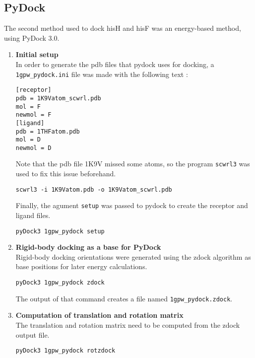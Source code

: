 \documentclass[11pt]{article}
\begin{document}
\subsection{PyDock}\label{pydock}

The second method used to dock hisH and hisF was an energy-based method,
using PyDock 3.0.

\begin{enumerate}
\def\labelenumi{\arabic{enumi}.}
\item
  \textbf{Initial setup}\\
  In order to generate the pdb files that pydock uses for docking, a
  \texttt{1gpw\_pydock.ini} file was made with the following text :

\begin{verbatim}
[receptor]  
pdb = 1K9Vatom_scwrl.pdb  
mol = F  
newmol = F    
[ligand]  
pdb = 1THFatom.pdb  
mol = D  
newmol = D  
\end{verbatim}

  Note that the pdb file 1K9V missed some atoms, so the program
  \texttt{scwrl3} was used to fix this issue beforehand.

\begin{verbatim}
scwrl3 -i 1K9Vatom.pdb -o 1K9Vatom_scwrl.pdb
\end{verbatim}

  Finally, the agument \texttt{setup} was passed to pydock to create the
  receptor and ligand files.

\begin{verbatim}
pyDock3 1gpw_pydock setup
\end{verbatim}
\item
  \textbf{Rigid-body docking as a base for PyDock}\\
  Rigid-body docking orientations were generated using the zdock
  algorithm as base positions for later energy calculations.

\begin{verbatim}
pyDock3 1gpw_pydock zdock
\end{verbatim}

  The output of that command creates a file named
  \texttt{1gpw\_pydock.zdock}.\\
\item
  \textbf{Computation of translation and rotation matrix}\\
  The translation and rotation matrix need to be computed from the zdock
  output file.

\begin{verbatim}
pyDock3 1gpw_pydock rotzdock
\end{verbatim}


\end{enumerate}
\end{document}
